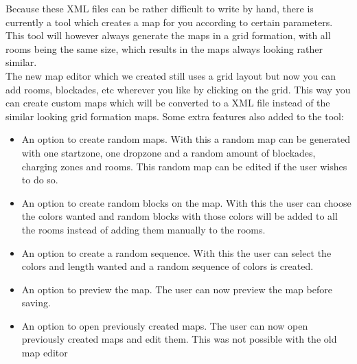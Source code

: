 Because these XML files can be rather difficult to write by hand, there is currently a tool which creates a map for you according to certain parameters. This tool will however always generate the maps in a grid formation, with all rooms being the same size, which results in the maps always looking rather similar. \\
The new map editor which we created still uses a grid layout but now you can add rooms, blockades, etc wherever you like by clicking on the grid. This way you can create custom maps which will be converted to a XML file instead of the similar looking grid formation maps. 
Some extra features also added to the tool:
\begin{itemize}
\item An option to create random maps. With this a random map can be generated with one startzone, one dropzone and a random amount of blockades, charging zones and rooms. This random map can be edited if the user wishes to do so.
\item An option to create random blocks on the map. With this the user can choose the colors wanted and random blocks with those colors will be added to all the rooms instead of adding them manually to the rooms.
\item An option to create a random sequence. With this the user can select the colors and length wanted and a random sequence of colors is created.
\item An option to preview the map. The user can now preview the map before saving.
\item An option to open previously created maps. The user can now open previously created maps and edit them. This was not possible with the old map editor
\end{itemize}
